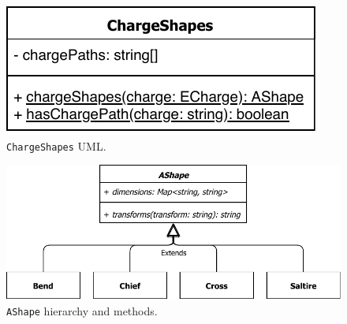 \begin{figure}[h]
  \includegraphics[width=0.5\linewidth]{ChargeShapesUML}
  \caption{\texttt{ChargeShapes} UML.}%
  \label{fig:ChargeShapesUML}
\end{figure}

\begin{figure}[h]
  \includegraphics[width=0.8\linewidth]{AShapeUML}
  \caption{\texttt{AShape} hierarchy and methods.}%
  \label{fig:AShapeUML}
\end{figure}

